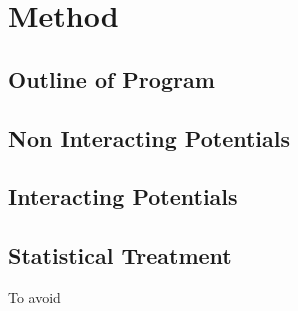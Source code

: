 \section{Method}\label{sec:Method}
\subsection{Outline of Program}
\subsection{Non Interacting Potentials}
\subsection{Interacting Potentials}

\subsection{Statistical Treatment}
To avoid 
